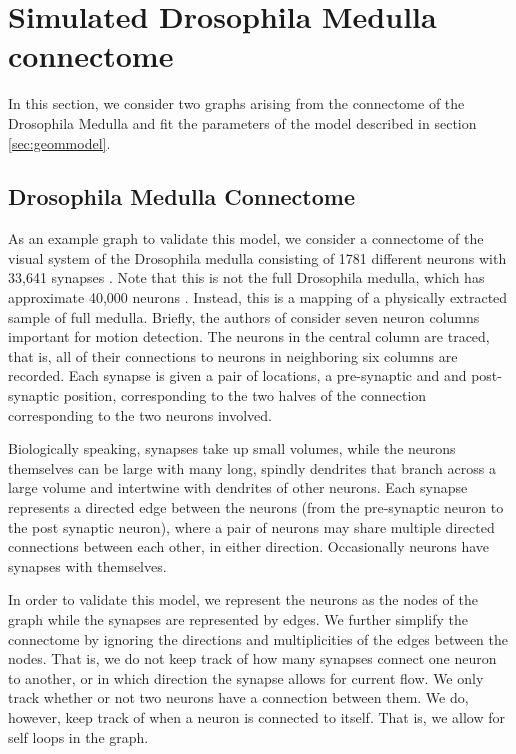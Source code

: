 \documentclass[11]{article}
\theoremstyle{remark}
\theoremstyle{definition}
\begin{document}
\section{Simulated Drosophila Medulla connectome \label{sec:connectomesimulation}}

In this section, we consider two graphs arising from the connectome of the Drosophila Medulla and fit the parameters of the model described in section \ref{sec:geommodel}. 

\subsection{Drosophila Medulla Connectome \label{sec:originalconnectome}}


As an example graph to validate this model, we consider a connectome of the visual system of the Drosophila medulla consisting of 1781 different neurons with 33,641 synapses \cite{neurodata}.  Note that this is not the full Drosophila medulla, which has approximate 40,000 neurons \cite{generaldrosophilla}. Instead, this is a mapping of a physically extracted sample of full medulla. Briefly, the authors of \cite{naturenetwork} consider seven neuron columns important for motion detection. The neurons in the central column are traced, that is, all of their connections to neurons in neighboring six columns are recorded. Each synapse is given a pair of locations, a pre-synaptic and and post-synaptic position, corresponding to the two halves of the connection corresponding to the two neurons involved.

Biologically speaking, synapses take up small volumes, while the neurons themselves can be large with many long, spindly dendrites that branch across a large volume and intertwine with dendrites of other neurons. Each synapse represents a directed edge between the neurons (from the pre-synaptic neuron to the post synaptic neuron), where a pair of neurons may share multiple directed connections between each other, in either direction. Occasionally neurons have synapses with themselves.

In order to validate this model, we represent the neurons as the nodes of the graph while the synapses are represented by edges. We further simplify the connectome by ignoring the directions and multiplicities of the edges between the nodes. That is, we do not keep track of how many synapses connect one neuron to another, or in which direction the synapse allows for current flow. We only track whether or not two neurons have a connection between them. We do, however, keep track of when a neuron is connected to itself. That is, we allow for self loops in the graph. 
\end{document}
